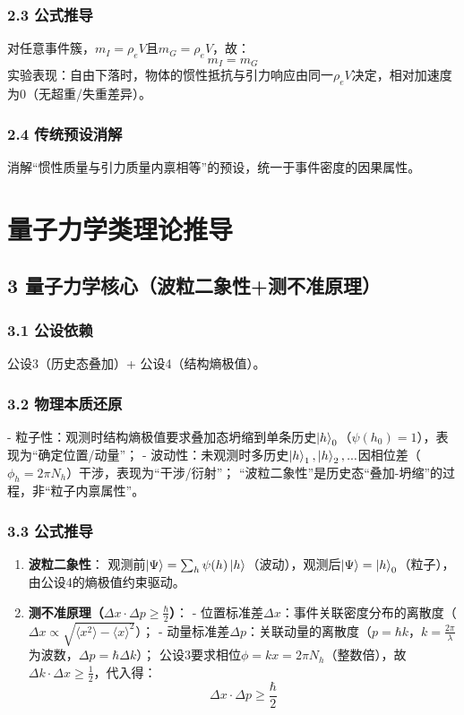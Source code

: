 \documentclass{article}
\newcommand{\rhoe}{\rho_e}       %
\newcommand{\hb}{\hbar}          %
\newcommand{\ps}{\ket{\Psi}}     %
\newcommand{\hs}{\ket{h}}        %
\begin{document}
\subsubsection{2.3 公式推导}
对任意事件簇，$m_I = \rhoe V$且$m_G = \rhoe V$，故：  
$$m_I = m_G$$  
实验表现：自由下落时，物体的惯性抵抗与引力响应由同一$\rhoe V$决定，相对加速度为0（无超重/失重差异）。

\subsubsection{2.4 传统预设消解}
消解“惯性质量与引力质量内禀相等”的预设，统一于事件密度的因果属性。

\newpage

\section{量子力学类理论推导}
\subsection{3 量子力学核心（波粒二象性+测不准原理）}
\subsubsection{3.1 公设依赖}
公设3（历史态叠加）+ 公设4（结构熵极值）。

\subsubsection{3.2 物理本质还原}
- 粒子性：观测时结构熵极值要求叠加态坍缩到单条历史$\hs_0$（$\psi(h_0)=1$），表现为“确定位置/动量”；  
- 波动性：未观测时多历史$\hs_1,\hs_2,...$因相位差（$\phi_h = 2\pi N_h$）干涉，表现为“干涉/衍射”；  
“波粒二象性”是历史态“叠加-坍缩”的过程，非“粒子内禀属性”。

\subsubsection{3.3 公式推导}
\begin{enumerate}
    \item \textbf{波粒二象性}：  
      观测前$\ps = \sum_h \psi(h) \hs$（波动），观测后$\ps = \hs_0$（粒子），由公设4的熵极值约束驱动。
    
    \item \textbf{测不准原理（$\Delta x \cdot \Delta p \geq \frac{\hb}{2}$）}：  
      - 位置标准差$\Delta x$：事件关联密度分布的离散度（$\Delta x \propto \sqrt{\langle x^2 \rangle - \langle x \rangle^2}$）；  
      - 动量标准差$\Delta p$：关联动量的离散度（$p = \hb k$，$k = \frac{2\pi}{\lambda}$为波数，$\Delta p = \hb \Delta k$）；  
      公设3要求相位$\phi = k x = 2\pi N_h$（整数倍），故$\Delta k \cdot \Delta x \geq \frac{1}{2}$，代入得：  
      $$\Delta x \cdot \Delta p \geq \frac{\hb}{2}$$
\end{enumerate}
\end{document}

